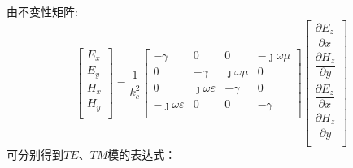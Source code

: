 由不变性矩阵:
\begin{equation}\label{4}
    \begin{bmatrix}
        E_x \\
        E_y \\
        H_x \\
        H_y \\
    \end{bmatrix}
    =\dfrac{1}{k_c^2}\begin{bmatrix}
        -\gamma                  & 0                       & 0               & -\jmath\omega\mu \\
        0                        & -\gamma                 & \jmath\omega\mu & 0                \\
        0                        & \jmath\omega\varepsilon & -\gamma         & 0                \\
        -\jmath\omega\varepsilon & 0                       & 0               & -\gamma          \\
    \end{bmatrix}
    \begin{bmatrix}
        \dfrac{\partial E_z}{\partial x} \\[8pt]
        \dfrac{\partial H_z}{\partial y} \\[8pt]
        \dfrac{\partial E_z}{\partial x} \\[8pt]
        \dfrac{\partial H_z}{\partial y} \\[8pt]
    \end{bmatrix}
\end{equation}
可分别得到$TE$、$TM$模的表达式：

